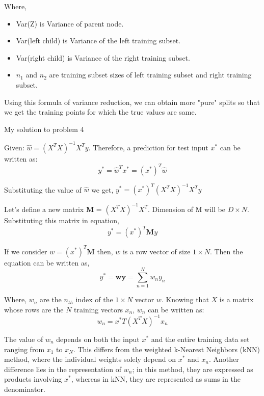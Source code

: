 \documentclass[a4paper,11pt]{article}
\begin{document}
\begin{mlsolution}
Where,
\begin{itemize}
	\item Var(Z) is Variance of parent node.
	\item Var(left child) is Variance of the left training subset.
	\item Var(right child) is Variance of the right training subset.
	\item $n_1$ and $n_2$ are training subset sizes of left training subset and right training subset.
\end{itemize}


Using this formula of variance reduction, we can obtain more "pure" splits so that we get the training points for which the true values are same. 

\end{mlsolution}

\begin{mlsolution}

My solution to problem 4

Given: $\hat{w} = (X^T X)^{-1}X^T y$. Therefore, a prediction for test input $x^*$ can be written as:
\[ y^* = \hat{w}^T x^* = {(x^*)}^T \hat{w} \]

Substituting the value of $\hat{w}$ we get,
$ y^* = (x^*)^T (X^T X)^{-1}X^T y $

 Let's define a new matrix \textbf{M} = $(X^T X)^{-1}X^T$. Dimension of M will be $D\times N$. Substituting this matrix in equation,
 \[ y^* = (x^*)^T\textbf{M}y \]

If we consider $w = (x^*)^T\textbf{M}$ then, $w$ is a row vector of size $1\times N$. Then the equation can be written as,
 \[y^* = \textbf{wy} = \sum_{n=1}^{N} w_n y_n \]

Where, $w_n$ are the $n_{th}$ index of the $1\times N$ vector $w$. Knowing that $X$ is a matrix whose rows are the $N$ training vectors $x_n$, $w_n$ can be written as:
\[ w_n = x^*T (X^T X)^{-1} x_n \]

The value of $w_n$ depends on both the input $x^*$ and the entire training data set ranging from $x_1$ to $x_N$. This differs from the weighted k-Nearest Neighbors (kNN) method, where the individual weights solely depend on $x^*$ and $x_n$. Another difference lies in the representation of $w_n$; in this method, they are expressed as products involving $x^*$, whereas in kNN, they are represented as sums in the denominator.

\end{mlsolution}
	
\end{document}
